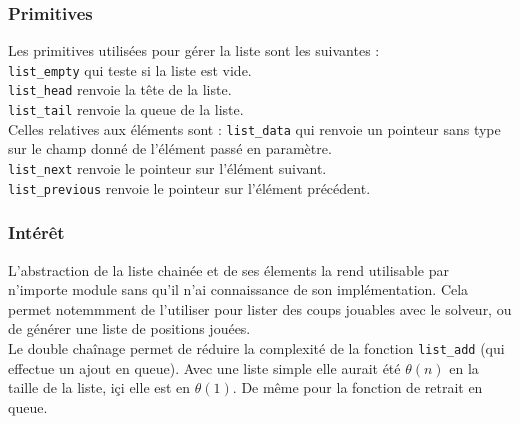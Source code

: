 	\subsubsection{Primitives}
  	Les primitives utilisées pour gérer la liste sont les suivantes : \\
	\texttt{list\_empty} qui teste si la liste est vide. \\
    \texttt{list\_head} renvoie la tête de la liste.\\
	\texttt{list\_tail} renvoie la queue de la liste. \\
    Celles relatives aux éléments sont :
	\texttt{list\_data} qui renvoie un pointeur sans type sur le champ donné de l'élément passé en paramètre.\\	
	\texttt{list\_next} renvoie le pointeur sur l'élément suivant. \\
	\texttt{list\_previous} renvoie le pointeur sur l'élément précédent. \\

	\subsubsection{Intérêt}
	L'abstraction de la liste chainée et de ses élements la rend utilisable par n'importe module sans qu'il n'ai connaissance de son implémentation. Cela permet notemmment de l'utiliser pour lister des coups jouables avec le solveur, ou de générer une liste de positions jouées. \\

	Le double chaînage permet de réduire la complexité de la fonction \texttt{list\_add} (qui effectue un ajout en queue). Avec une liste simple elle aurait été $\theta(n)$ en la taille de la liste, içi elle est en $\theta(1)$. De même pour la fonction de retrait en queue.\\






































